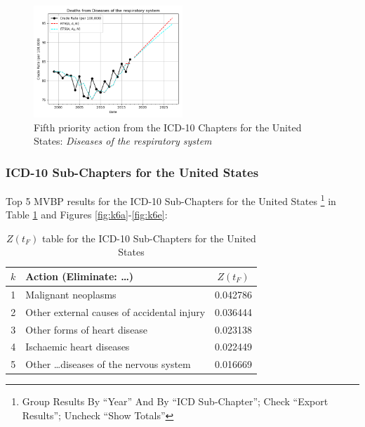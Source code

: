\documentclass[10pt, a4paper, twocolumn]{IEEEconf}
\newcommand\footnotesstartsep{}
\begin{document}
\begin{figure}[H]
  \centering
  \includegraphics[width=0.5\textwidth]{results/US_ICD10_CHAPTERS/Diseases_of_the_respiratory_system_ets.png}
  \caption{Fifth priority action from the ICD-10 Chapters for the United States: \textit{Diseases of the respiratory system}}\label{fig:k5e}
\end{figure}

\clearpage

\subsubsection{ICD-10 Sub-Chapters for the United States}

Top 5 MVBP results for the ICD-10 Sub-Chapters for the United States \citep{centers2017underlying}\footnotesstartsep\footnote{Group Results By \enquote{Year} And By \enquote{ICD Sub-Chapter}; Check \enquote{Export Results}; Uncheck \enquote{Show Totals}} in Table \ref{table:ztable6} and Figures \ref{fig:k6a}-\ref{fig:k6e}:

\begin{table}[H]
  \centering
  \begin{tabular}{clc}
    \toprule
      $k$ & Action (Eliminate: \ldots) & $Z(t_F)$ \\
    \midrule
      1 &                               Malignant neoplasms & 0.042786 \\
      2 &        Other external causes of accidental injury & 0.036444 \\
      3 &                      Other forms of heart disease & 0.023138 \\
      4 &                          Ischaemic heart diseases & 0.022449 \\
      5 &       Other \ldots diseases of the nervous system & 0.016669 \\
    \bottomrule
  \end{tabular}
  \caption{$Z(t_F)$ table for the ICD-10 Sub-Chapters for the United States}
  \label{table:ztable6}
\end{table}
\end{document}
